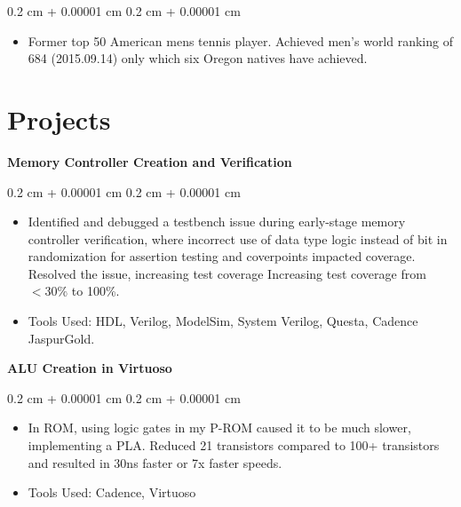 \documentclass[10pt, letterpaper]{article}
\newenvironment{highlights}{
    \begin{itemize}[
        topsep=0.10 cm,
        parsep=0.10 cm,
        partopsep=0pt,
        itemsep=0pt,
        leftmargin=0.4 cm + 10pt
    ]
}{
    \end{itemize}
} %
\newenvironment{onecolentry}{
    \begin{adjustwidth}{
        0.2 cm + 0.00001 cm
    }{
        0.2 cm + 0.00001 cm
    }
}{
    \end{adjustwidth}
} %
\begin{document}
        \vspace{0.10 cm}
        \begin{onecolentry}
            \begin{highlights}
                \item Former top 50 American mens tennis player. Achieved men's world ranking of 684 (2015.09.14) only which six Oregon natives have achieved. 
            \end{highlights}
        \end{onecolentry}
    \section{Projects}

        \textbf{Memory Controller Creation and Verification}

        \vspace{0.10 cm}
        \begin{onecolentry}
            \begin{highlights}
                \item Identified and debugged a testbench issue during early-stage memory controller verification, where incorrect use of data type logic instead of bit in randomization for assertion testing and coverpoints impacted coverage. Resolved the issue, increasing test coverage Increasing test coverage from \( < 30\% \) to 100\%.
                \item Tools Used: HDL, Verilog, ModelSim, System Verilog, Questa, Cadence JaspurGold.
            \end{highlights}
        \end{onecolentry}

        \vspace{0.2 cm}

        \textbf{ALU Creation in Virtuoso}

        \vspace{0.10 cm}
        \begin{onecolentry}
            \begin{highlights}
                \item In ROM, using logic gates in my P-ROM caused it to be much slower, implementing a PLA. Reduced 21 transistors compared to 100+ transistors and resulted in 30ns faster or 7x faster speeds.
                \item Tools Used: Cadence, Virtuoso
            \end{highlights}
        \end{onecolentry}
\end{document}
